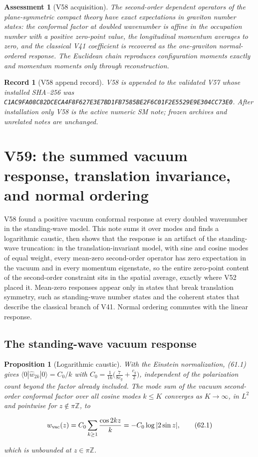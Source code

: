 \documentclass[11pt]{article}
\newtheorem{proposition}[theorem]{Proposition}
\newtheorem{assessment}[theorem]{Assessment}
\newtheorem{record}[theorem]{Record}
\theoremstyle{remark}
\begin{document}
\begin{assessment}[V58 acquisition]
\label{ass:v19v58}
The second-order dependent operators of the plane-symmetric compact
theory have exact expectations in graviton number states: the conformal
factor at doubled wavenumber is affine in the occupation number with a
positive zero-point value, the longitudinal momentum averages to zero,
and the classical V41 coefficient is recovered as the one-graviton
normal-ordered response.  The Euclidean chain reproduces configuration
moments exactly and momentum moments only through reconstruction.
\end{assessment}

\begin{record}[V58 append record]
\label{rec:v19v58}
V58 is appended to the validated V57 whose installed SHA--256 was
\texttt{C1AC9FA08C82DCECA4F8F627E3E7BD1FB7585BE2F6C01F2E5529E9E304CC73E0}.
After installation only V58 is the active numeric SM note; frozen
archives and unrelated notes are unchanged.
\end{record}


\section{V59: the summed vacuum response, translation invariance, and normal ordering}
\label{sec:v19v59}

V58 found a positive vacuum conformal response at every doubled
wavenumber in the standing-wave model.  This note sums it over modes
and finds a logarithmic caustic, then shows that the response is an
artifact of the standing-wave truncation: in the translation-invariant
model, with sine and cosine modes of equal weight, every mean-zero
second-order operator has zero expectation in the vacuum and in every
momentum eigenstate, so the entire zero-point content of the
second-order constraint sits in the spatial average, exactly where V52
placed it.  Mean-zero responses appear only in states that break
translation symmetry, such as standing-wave number states and the
coherent states that describe the classical branch of V41.  Normal
ordering commutes with the linear response.

\subsection{The standing-wave vacuum response}

\begin{proposition}[Logarithmic caustic]
\label{prop:v19v59-log}
With the Einstein normalization, (61.1) gives
\(\langle0|\hat w_{2k}|0\rangle=C_0/k\) with
\(C_0=\tfrac1{16}\bigl(\tfrac7{8c_g}+\tfrac{c_g}2\bigr)\), independent of
the polarization count beyond the factor already included.  The mode
sum of the vacuum second-order conformal factor over all cosine modes
\(k\leq K\) converges as \(K\to\infty\), in \(L^2\) and pointwise for
\(z\notin\pi\mathbb Z\), to

\[
 w_{\rm vac}(z)=C_0\sum_{k\geq1}\frac{\cos2kz}k=-C_0\log|2\sin z|,
                                                                    \tag{62.1}
\]

which is unbounded at \(z\in\pi\mathbb Z\).
\end{proposition}
\end{document}
